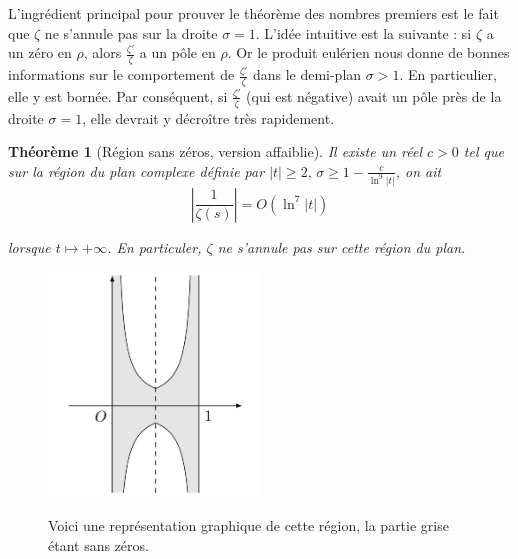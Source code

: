 \documentclass[french]{report}
\newtheorem{theorem}{Théorème}[section]
\begin{document}
L'ingrédient principal pour prouver le théorème des nombres premiers est le fait que $\zeta$ ne s'annule pas sur la droite $\sigma=1$. L'idée intuitive est la suivante : si $\zeta$ a un zéro en $\rho$, alors $\frac{\zeta'}{\zeta}$ a un pôle en $\rho$. Or le produit eulérien nous donne de bonnes informations sur le comportement de $\frac{\zeta'}{\zeta}$ dans le demi-plan $\sigma>1$. En particulier, elle y est bornée. Par conséquent, si $\frac{\zeta'}{\zeta}$  (qui est négative) avait un pôle près de la droite $\sigma=1$, elle devrait y décroître très rapidement.

\begin{theorem}[Région sans zéros, version affaiblie]\label{eq:region-faible-sans-zero}
  Il existe un réel $c>0$ tel que sur la région du plan complexe définie par $|t|\geq2,\,\sigma\geq1-\frac{c}{\ln^9|t|}$, on ait
  \[ \left|\frac{1}{\zeta(s)}\right| = O(\ln^7|t|) \]

  lorsque $t\mapsto+\infty$. En particuler, $\zeta$ ne s'annule pas sur cette région du plan.
\end{theorem}

\begin{figure}[h]
  \centering
  \caption{Voici une représentation graphique de cette région, la partie grise étant sans zéros.}
  \includegraphics[width=0.5\textwidth]{fig_region_sans_zeros.png}
  \label{fig:region-sans-zero}
\end{figure}
    
\end{document}
